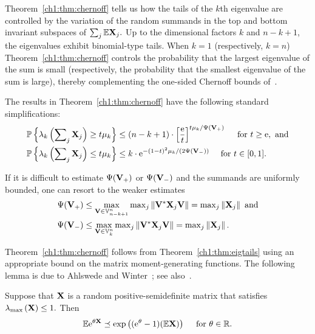Theorem~\ref{ch1:thm:chernoff} tells us how the tails of the $k$th eigenvalue are
controlled by the variation of the random summands in the top and bottom
invariant subspaces of $\sum_j \mathbb{E} \mathbf{X}_j.$ Up to the dimensional factors $k$
and $n-k+1$, the eigenvalues exhibit binomial-type tails. When $k=1$
(respectively, $k=n$) Theorem~\ref{ch1:thm:chernoff} controls the probability that
the largest eigenvalue of the sum is small (respectively, the probability that
the smallest eigenvalue of the sum is large), thereby complementing the
one-sided Chernoff bounds of~\cite{T10a}.

\begin{remark}
The results in Theorem~\ref{ch1:thm:chernoff} have the following standard
 simplifications:
  \begin{align*}
  \mathbb{P}\left\{\lambda_k\left(\sum\nolimits_j \mathbf{X}_j \right) \geq t\mu_k\right\} & \leq
 (n-k+1) \cdot \left[ \frac{\mathrm{e}}{t} \right]^{t \mu_k/\Psi(\mathbf{V}_+)} \quad
 \text{ for } t\geq \mathrm{e},\text{ and} \\
  \mathbb{P}\left\{\lambda_k\left(\sum\nolimits_j \mathbf{X}_j \right) \leq t\mu_k\right\} & \leq k
 \cdot \mathrm{e}^{-(1-t)^2\mu_k/(2 \Psi(\mathbf{V}_-))} \quad \text{ for } t \in [0,1].
 \end{align*}
\end{remark}

\begin{remark}
If it is difficult to estimate $\Psi(\mathbf{V}_+)$ or $\Psi(\mathbf{V}_{-})$
and the summands are uniformly bounded, one can resort to the weaker estimates
\begin{align*}
	\Psi(\mathbf{V}_{+}) & \leq \max_{\mathbf{V} \in \mathbb{V}_{n-k+1}^{n}}
\max\nolimits_j \left\|\mathbf{V}^* \mathbf{X}_j \mathbf{V}\right\| = \max\nolimits_j
\left\|\mathbf{X}_j\right\|\text{ and} \\
	\Psi(\mathbf{V}_{-}) & \leq \max_{\mathbf{V} \in \mathbb{V}_{k}^{n}}
\max\nolimits_j \left\|\mathbf{V}^* \mathbf{X}_j \mathbf{V}\right\| = \max\nolimits_j
\left\|\mathbf{X}_j\right\|.
\end{align*}
\end{remark}

Theorem~\ref{ch1:thm:chernoff} follows from Theorem~\ref{ch1:thm:eigtails} using an
appropriate bound on the matrix moment-generating functions. The following lemma
is due to Ahlswede and Winter~\cite{AW02}; see also~\cite[Lem.~5.8]{T10a}.

\begin{lemma}
Suppose that $\mathbf{X}$ is a random positive-semidefinite matrix that satisfies
$\lambda_{\mathrm{max}}\left(\mathbf{X}\right) \leq 1.$ Then
$$ \mathbb{E} \mathrm{e}^{\theta \mathbf{X}} \preceq \mathrm{exp}\left( (\mathrm{e}^\theta - 1) (\mathbb{E}\mathbf{X}) \right)
\quad \text{ for } \theta \in \mathbb{R}. $$
\label{ch1:lemma:chernoffmgf}
\end{lemma}

